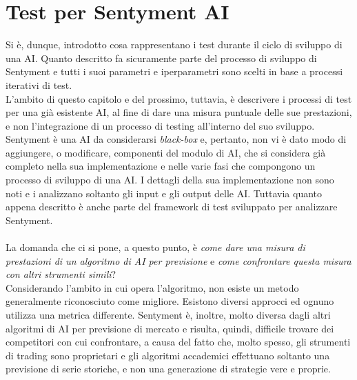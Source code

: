 \documentclass[a4paper,12pt]{report}
\begin{document}
\section{Test per Sentyment AI}
Si è, dunque, introdotto cosa rappresentano i test durante il ciclo di sviluppo di una AI. Quanto descritto fa sicuramente parte del processo di sviluppo di Sentyment e tutti i suoi parametri e iperparametri sono scelti in base a processi iterativi di test.\\ L'ambito di questo capitolo e del prossimo, tuttavia, è descrivere i processi di test per una già esistente AI, al fine di dare una misura puntuale delle sue prestazioni, e non l'integrazione di un processo di testing all'interno del suo sviluppo. Sentyment è una AI da considerarsi \textit{black-box} e, pertanto, non vi è dato modo di aggiungere, o modificare, componenti del modulo di AI, che si considera già completo nella sua implementazione e nelle varie fasi che compongono un processo di sviluppo di una AI. I dettagli della sua implementazione non sono noti e i analizzano soltanto gli input e gli output delle AI. Tuttavia quanto appena descritto è anche parte del framework di test sviluppato per analizzare Sentyment.\\~\\ La domanda che ci si pone, a questo punto, è \textit{come dare una misura di prestazioni di un algoritmo di AI per previsione} e \textit{come confrontare questa misura con altri strumenti simili}?\\ Considerando l'ambito in cui opera l'algoritmo, non esiste un metodo generalmente riconosciuto come migliore. Esistono diversi approcci ed ognuno utilizza una metrica differente. Sentyment è, inoltre, molto diversa dagli altri algoritmi di AI per previsione di mercato e risulta, quindi, difficile trovare dei competitori con cui confrontare, a causa del fatto che, molto spesso, gli strumenti di trading sono proprietari e gli algoritmi accademici effettuano soltanto una previsione di serie storiche, e non una generazione di strategie vere e proprie.\\~\\
\end{document}
